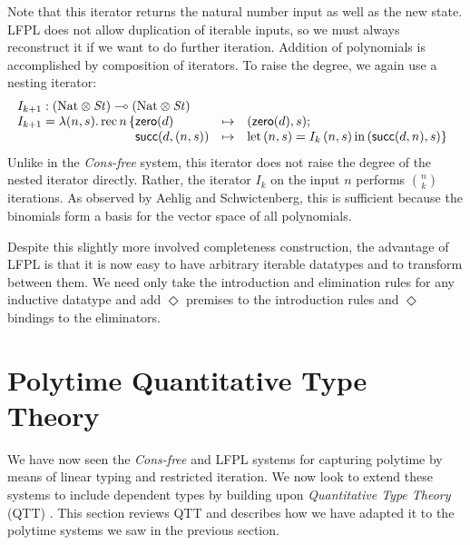 \documentclass[acmsmall,screen]{acmart}
\newcommand{\tmRec}{\mathrm{rec}}
\newcommand{\tyNat}{\mathrm{Nat}}
\newcommand{\conZero}{\mathsf{zero}}
\newcommand{\conSucc}{\mathsf{succ}}
\newcommand{\Let}{\mathrm{let}}
\newcommand{\In}{\mathrm{in}}
\newcommand{\ConsFree}{\emph{Cons-free}}
\begin{document}
Note that this iterator returns the natural number input as well as
the new state. LFPL does not allow duplication of iterable inputs, so
we must always reconstruct it if we want to do further
iteration. Addition of polynomials is accomplished by composition of
iterators. To raise the degree, we again use a nesting iterator:
\begin{displaymath}
  \begin{array}{l}
    I_{k+1} : (\tyNat \otimes \mathit{St}) \multimap (\tyNat \otimes \mathit{St}) \\
    I_{k+1} = \lambda (n,s).\,\tmRec\,n\,\{
    \begin{array}[t]{@{}lcl}
      \conZero(d)&\mapsto&(\conZero(d),s); \\
      \conSucc(d,(n,s)) &\mapsto& \Let\,(n,s)=I_k\,(n,s)\,\In\,(\conSucc(d,n), s) \}
    \end{array}
  \end{array}
\end{displaymath}
Unlike in the \ConsFree{} system, this iterator does not raise
the degree of the nested iterator directly. Rather, the iterator $I_k$
on the input $n$ performs $\binom{n}{k}$ iterations. As observed by
Aehlig and Schwictenberg, this is sufficient because the binomials
form a basis for the vector space of all polynomials.

Despite this slightly more involved completeness construction, the
advantage of LFPL is that it is now easy to have arbitrary iterable
datatypes and to transform between them. We need only take the
introduction and elimination rules for any inductive datatype and add
$\Diamond$ premises to the introduction rules and $\Diamond$ bindings
to the eliminators.

\section{Polytime Quantitative Type Theory}
\label{sec:qtt}

We have now seen the \ConsFree{} and LFPL systems for
capturing polytime by means of linear typing and restricted
iteration. We now look to extend these systems to include dependent
types by building upon \emph{Quantitative Type Theory} (QTT)
\cite{atkey18qtt,mcbride16}. This section reviews QTT and describes
how we have adapted it to the polytime systems we saw in the previous
section.
\end{document}

